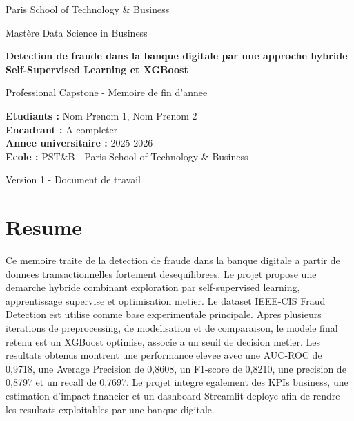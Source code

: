 ﻿\documentclass[12pt,a4paper]{report}
\begin{document}

\begin{titlepage}
    \centering
    \vspace*{1cm}
    {\Large Paris School of Technology \& Business \par}
    \vspace{0.5cm}
    {\large Mast\`ere Data Science in Business \par}
    \vspace{2cm}
    {\Huge\bfseries Detection de fraude dans la banque digitale par une approche hybride Self-Supervised Learning et XGBoost \par}
    \vspace{1cm}
    {\Large Professional Capstone - Memoire de fin d'annee \par}
    \vspace{2cm}
    \begin{flushleft}
    \textbf{Etudiants :} Nom Prenom 1, Nom Prenom 2\\
    \textbf{Encadrant :} A completer\\
    \textbf{Annee universitaire :} 2025-2026\\
    \textbf{Ecole :} PST\&B - Paris School of Technology \& Business
    \end{flushleft}
    \vfill
    {\large Version 1 - Document de travail \par}
\end{titlepage}

\chapter*{Resume}

Ce memoire traite de la detection de fraude dans la banque digitale a partir de donnees transactionnelles fortement desequilibrees. Le projet propose une demarche hybride combinant exploration par self-supervised learning, apprentissage supervise et optimisation metier. Le dataset IEEE-CIS Fraud Detection est utilise comme base experimentale principale. Apres plusieurs iterations de preprocessing, de modelisation et de comparaison, le modele final retenu est un XGBoost optimise, associe a un seuil de decision metier. Les resultats obtenus montrent une performance elevee avec une AUC-ROC de 0,9718, une Average Precision de 0,8608, un F1-score de 0,8210, une precision de 0,8797 et un recall de 0,7697. Le projet integre egalement des KPIs business, une estimation d'impact financier et un dashboard Streamlit deploye afin de rendre les resultats exploitables par une banque digitale.
\end{document}
